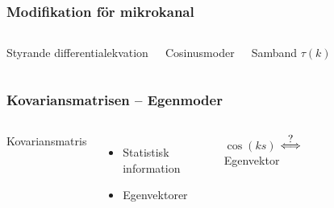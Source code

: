 \documentclass[swedish]{beamer}
\newcommand\impl{\stackrel{\mathclap{\normalfont\mbox{?}}}{\Longleftrightarrow}}
\begin{document}
\begin{frame}
\frametitle{Modifikation för mikrokanal}
 \begin{columns}[c]

Styrande differentialekvation
\vspace{8mm}

Cosinusmoder
\vspace{8mm}

Samband $\tau(k)$



\begin{figure}
\resizebox{!}{!}{}
\end{figure}


\end{columns}

\end{frame}


\begin{frame}
\frametitle{Kovariansmatrisen -- Egenmoder}

\begin{columns}[c]
Kovariansmatris
\begin{itemize}[label={$\bullet$}]
    \item Statistisk information
    \item Egenvektorer
\end{itemize}
\vspace{1cm}

$\cos (ks)$ $\impl$ Egenvektor

\begin{figure}

\end{figure}

\end{columns}
    
\end{frame}
\end{document}
